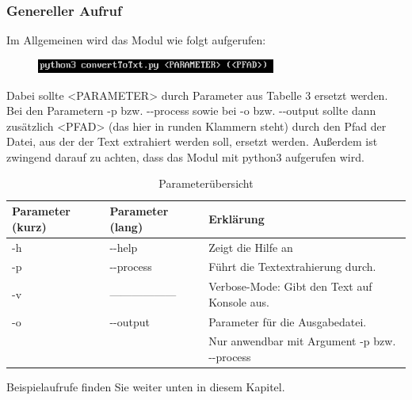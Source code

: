 \documentclass[12pt]{scrartcl}
\begin{document}
\subsubsection{Genereller Aufruf}
\label{sec:first-steps-general}
Im Allgemeinen wird das Modul wie folgt aufgerufen:
\begin{figure}[htbp]
\centering
\includegraphics[width=0.7\textwidth]{ersteSchritte001}\par\vspace{0.25cm}
\label{fig:ersteSchritteGeneral001}
\end{figure}
\newline
Dabei sollte <PARAMETER> durch Parameter aus Tabelle 3 ersetzt werden. Bei  den Parametern -p bzw. -{}-process sowie bei -o bzw. -{}-output sollte dann zusätzlich <PFAD> (das hier in runden Klammern steht) durch den Pfad der Datei, aus der der Text extrahiert werden soll, ersetzt werden. 
Außerdem ist zwingend darauf zu achten, dass das Modul mit python3 aufgerufen wird.
\begin{table}[H]
\begin{center}
\label{params}
\begin{tabular}{|l|l|l|}
\hline
\rowcolor[HTML]{C0C0C0} 
Parameter (kurz) & Parameter (lang) & Erklärung                                                                                                                              \\ \hline
-h               & -{}-help           & Zeigt die Hilfe an                                                                                                                     \\ \hline
-p               & -{}-process        & Führt die Textextrahierung durch.  \\ \hline
-v				 & ------------------ & Verbose-Mode: Gibt den Text auf Konsole aus. \\ \hline
-o               & -{}-output         & Parameter für die Ausgabedatei.\\
				 &					  &	Nur anwendbar mit Argument -p bzw. -{}-process \\ \hline
\end{tabular}
\caption{Parameterübersicht}
\end{center}
\end{table}

Beispielaufrufe finden Sie weiter unten in diesem Kapitel. 
\newpage
\end{document}
